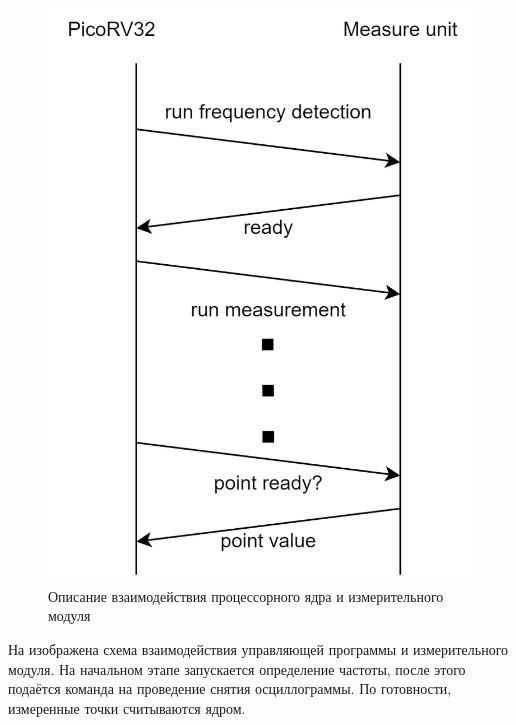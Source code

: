 \begin{figure}[ht!] 
	\center
	\includegraphics [scale=0.3] {my_folder/images//alg}
	\caption{Описание взаимодействия процессорного ядра и измерительного модуля} 
	\label{fig:alg}  
\end{figure}

\FloatBarrier

На  изображена схема взаимодействия управляющей программы и измерительного модуля.
На начальном этапе запускается определение частоты, после этого подаётся команда на проведение
снятия осциллограммы. По готовности, измеренные точки считываются ядром.

\newpage